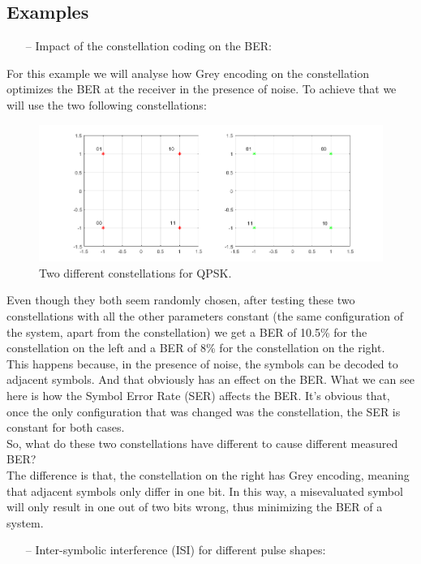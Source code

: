 \subsection*{Examples}
\begin{itemize}
  \item[--] Impact of the constellation coding on the BER:
\end{itemize}
  For this example we will analyse how Grey encoding on the constellation optimizes the BER at the receiver in the presence of noise.
  To achieve that we will use the two following constellations:
    \begin{figure}[H]
    	\centering \includegraphics[width=\textwidth]{./lib/m_qam_transmitter/figures/constellations_qpsk.png}
    	\caption{Two different constellations for QPSK.}\label{QPSK_Constellations}
    \end{figure}
  Even though they both seem randomly chosen, after testing these two constellations with all the other parameters constant (the same configuration of the system, apart from the constellation) we get a BER of 10.5\% for the constellation on the left and a BER of 8\% for the constellation on the right.\\
  This happens because, in the presence of noise, the symbols can be decoded to adjacent symbols. And that obviously has an effect on the BER. What we can see here is how the Symbol Error Rate (SER) affects the BER. It's obvious that, once the only configuration that was changed was the constellation, the SER is constant for both cases. \\
  So, what do these two constellations have different to cause different measured BER?\\
  The difference is that, the constellation on the right has Grey encoding, meaning that adjacent symbols only differ in one bit. In this way, a misevaluated symbol will only result in one out of two bits wrong, thus minimizing the BER of a system.
\begin{itemize}
  \item[--] Inter-symbolic interference (ISI) for different pulse shapes:
\end{itemize}
